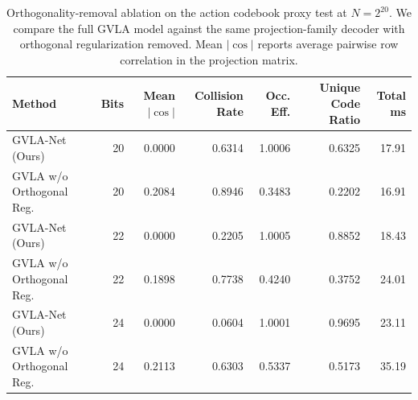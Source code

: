 \begin{table}[t]
\centering
\caption{Orthogonality-removal ablation on the action codebook proxy test at $N=2^{20}$. We compare the full GVLA model against the same projection-family decoder with orthogonal regularization removed. Mean $|\cos|$ reports average pairwise row correlation in the projection matrix.}
\label{tab:no_ortho_ablation}
\scriptsize
\begin{tabular}{lrrrrrr}
\toprule
Method & Bits & Mean $|\cos|$ & Collision Rate & Occ. Eff. & Unique Code Ratio & Total ms \\
\midrule
GVLA-Net (Ours) & 20 & 0.0000 & 0.6314 & 1.0006 & 0.6325 & 17.91 \\
GVLA w/o Orthogonal Reg. & 20 & 0.2084 & 0.8946 & 0.3483 & 0.2202 & 16.91 \\
GVLA-Net (Ours) & 22 & 0.0000 & 0.2205 & 1.0005 & 0.8852 & 18.43 \\
GVLA w/o Orthogonal Reg. & 22 & 0.1898 & 0.7738 & 0.4240 & 0.3752 & 24.01 \\
GVLA-Net (Ours) & 24 & 0.0000 & 0.0604 & 1.0001 & 0.9695 & 23.11 \\
GVLA w/o Orthogonal Reg. & 24 & 0.2113 & 0.6303 & 0.5337 & 0.5173 & 35.19 \\
\bottomrule
\end{tabular}
\end{table}
